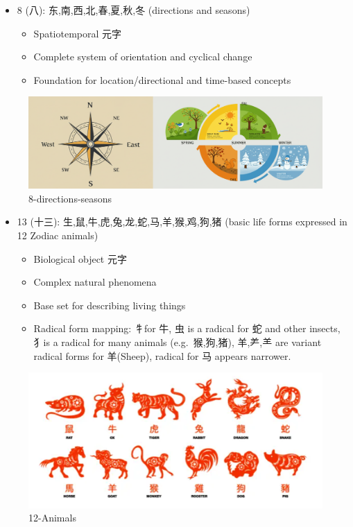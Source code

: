 \documentclass[
  11pt,
  letterpaper,
]{article}
\providecommand{\tightlist}{%
  \setlength{\itemsep}{0pt}\setlength{\parskip}{0pt}}
\begin{document}
\begin{itemize}
\tightlist
\item
  8 (八): 东,南,西,北,春,夏,秋,冬 (directions and seasons)

  \begin{itemize}
  \tightlist
  \item
    Spatiotemporal 元字
  \item
    Complete system of orientation and cyclical change
  \item
    Foundation for location/directional and time-based concepts
  \end{itemize}
\end{itemize}

\begin{figure}
\centering
\includegraphics{./images/8-directions-seasons.png}
\caption{8-directions-seasons}
\end{figure}

\begin{itemize}
\tightlist
\item
  13 (十三): 生,鼠,牛,虎,兔,龙,蛇,马,羊,猴,鸡,狗,猪 (basic life forms
  expressed in 12 Zodiac animals)

  \begin{itemize}
  \tightlist
  \item
    Biological object 元字
  \item
    Complex natural phenomena
  \item
    Base set for describing living things
  \item
    Radical form mapping: 牜for 牛, 虫 is a radical for 蛇 and other
    insects, 犭is a radical for many animals (e.g.~猴,狗,猪), 羊,⺶,⺷
    are variant radical forms for 羊(Sheep), radical for 马 appears
    narrower.
  \end{itemize}
\end{itemize}

\begin{figure}
\centering
\includegraphics{./images/12-zodiac-animals.png}
\caption{12-Animals}
\end{figure}
\end{document}
